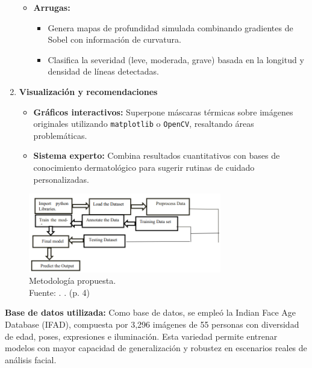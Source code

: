 \begin{enumerate}
\begin{itemize}
        \item \textbf{Arrugas:}
        \begin{itemize}
            \item Genera mapas de profundidad simulada combinando gradientes de Sobel con información de curvatura.
            \item Clasifica la severidad (leve, moderada, grave) basada en la longitud y densidad de líneas detectadas.
        \end{itemize}
    \end{itemize}

    \item \textbf{Visualización y recomendaciones}
    \begin{itemize}
        \item \textbf{Gráficos interactivos:} Superpone máscaras térmicas sobre imágenes originales utilizando \texttt{matplotlib} o \texttt{OpenCV}, resaltando áreas problemáticas.
        \item \textbf{Sistema experto:} Combina resultados cuantitativos con bases de conocimiento dermatológico para sugerir rutinas de cuidado personalizadas.
    \end{itemize}
\end{enumerate}

\begin{figure}[H]
	\begin{center}
		\includegraphics[width=0.75\textwidth]{2/figures/metoant5.png}
		\caption[Metodología propuesta]{Metodología propuesta.\\
			Fuente: \cite{Tamilkodi2024}. . (p. 4)}
		\label{2:fig8}
	\end{center}
\end{figure}

\textbf{Base de datos utilizada:}
Como base de datos, se empleó la Indian Face Age Database (IFAD), compuesta por 3,296 imágenes de 55 personas con diversidad de edad, poses, expresiones e iluminación. Esta variedad permite entrenar modelos con mayor capacidad de generalización y robustez en escenarios reales de análisis facial.  

